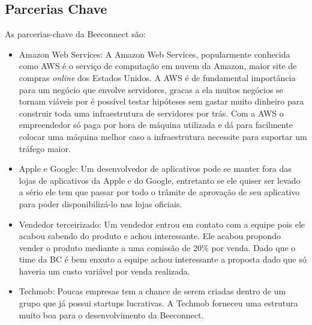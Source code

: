 \subsection{Parcerias Chave}
\label{cha:parcerias_chave}
As parcerias-chave da Beeconnect são:
\begin{itemize}
\item Amazon Web Services: A Amazon Web Services, popularmente conhecida como AWS é o serviço de computação em nuvem da Amazon, maior site de compras \textit{online} dos Estados Unidos. A AWS é de fundamental importância para um negócio que envolve servidores, gracas a ela muitos negócios se tornam viáveis por é possível testar hipóteses sem gastar muito dinheiro para construir toda uma infraestrutura de servidores por trás. Com a AWS o empreendedor só paga por hora de máquina utilizada e dá para facilmente colocar uma máquina melhor caso a infraestrutura necessite para suportar um tráfego maior.
\item Apple e Google: Um desenvolvedor de aplicativos pode se manter fora das lojas de aplicativos da Apple e do Google, entretanto se ele quiser ser levado a sério ele tem que passar por todo o trâmite de aprovação de seu aplicativo para poder disponibilizá-lo nas lojas oficiais. 
\item Vendedor terceirizado: Um vendedor entrou em contato com a equipe pois ele acabou sabendo do produto e achou interessante. Ele acabou propondo vender o produto mediante a uma comissão de 20\% por venda. Dado que o time da BC é bem enxuto a equipe achou interessante a proposta dado que só haveria um custo variável por venda realizada.
\item Techmob: Poucas empresas tem a chance de serem criadas dentro de um grupo que já possui startups lucrativas. A Techmob forneceu uma estrutura muito boa para o desenvolvimento da Beeconnect.
\end{itemize}

